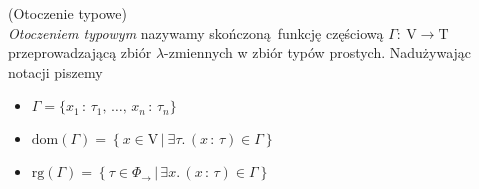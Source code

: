   
    

\begin{definicja}(Otoczenie typowe)\\
  \emph{Otoczeniem typowym} nazywamy skończoną funkcję częściową \(\Gamma:\:\mathrm{V}\to\mathrm{T}\) przeprowadzającą zbiór \(\lambda\)-zmiennych w zbiór typów prostych. Nadużywając notacji piszemy
    \begin{itemize}
      \item \(\Gamma=\{x_1\,:\,\tau_1,\,\dots,\,x_n\,:\,\tau_n\}\)
      \item \(\mathrm{dom}(\Gamma) = \left\{x\in \mathrm{V}\,|\:\exists\tau.\,(x\,:\,\tau)\in\Gamma\right\}\)
      \item \(\mathrm{rg}(\Gamma)=\left\{\tau\in\Phi_{\to}\,|\,\exists x.\,(x\,:\,\tau)\in\Gamma\right\}\)
    \end{itemize}
\end{definicja}

